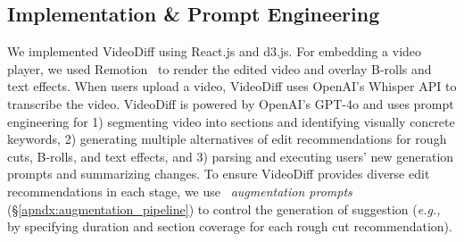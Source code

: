 \subsection{Implementation \& Prompt Engineering}
We implemented VideoDiff using React.js and d3.js. For embedding a video player, we used Remotion~\cite{remotion} to render the edited video and overlay B-rolls and text effects. 
When users upload a video, VideoDiff uses OpenAI's Whisper API to transcribe the video. VideoDiff is powered by OpenAI's GPT-4o and uses prompt engineering for 1) segmenting video into sections and identifying visually concrete keywords, 2) generating multiple alternatives of edit recommendations for rough cuts, B-rolls, and text effects, and 3) parsing and executing users' new generation prompts and summarizing changes. 
To ensure VideoDiff provides diverse edit recommendations in each stage, we use ~\textit{augmentation prompts} (\S\ref{apndx:augmentation_pipeline}) to control the generation of suggestion (\textit{e.g.,} by specifying duration and section coverage for each rough cut recommendation). 
